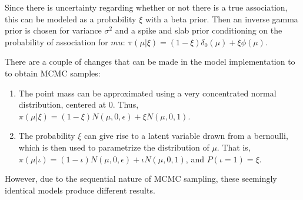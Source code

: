 \documentclass[12pt,twoside]{dukestatscithesis}
\theoremstyle{definition}
\theoremstyle{definition}
\theoremstyle{definition}
\theoremstyle{remark}
\begin{document}
\begin{Shaded}
\begin{Highlighting}[]
\NormalTok{(}\NormalTok{)}
\StringTok{ }
\StringTok{ }\OperatorTok{^}\NormalTok{(}\OperatorTok{-}\NormalTok{)) }
\StringTok{ }\NormalTok{(}\OperatorTok{*}
 \OperatorTok{:}
\NormalTok{    Y[((i}\OperatorTok{-}\NormalTok{)}\OperatorTok{*}\OperatorTok{+}\NormalTok{)}\OperatorTok{:}\OperatorTok{*}\NormalTok{observations)]<-}\NormalTok{, }\OperatorTok{/}\NormalTok{(}\OperatorTok{+}
\NormalTok{    site[((i}\OperatorTok{-}\NormalTok{)}\OperatorTok{*}\OperatorTok{+}\NormalTok{)}\OperatorTok{:}\OperatorTok{*}\NormalTok{observations)]<-}\StringTok{ }
\NormalTok{\}}
\NormalTok{<-}\NormalTok{(}\OperatorTok{*}

\NormalTok{(}\NormalTok{)}
\NormalTok{#############}
\end{Highlighting}
\end{Shaded}
Since there is uncertainty regarding whether or not there is a true
association, this can be modeled as a probability \(\xi\) with a beta
prior. Then an inverse gamma prior is chosen for variance \(\sigma^2\)
and a spike and slab prior conditioning on the probability of
association for \(mu\):
\(\pi(\mu|\xi) = (1-\xi ) \delta_0(\mu)+ \xi\phi(\mu)\).

There are a couple of changes that can be made in the model
implementation to to obtain MCMC samples:
\begin{enumerate}
\def\labelenumi{\arabic{enumi}.}
\item
  The point mass can be approximated using a very concentrated normal
  distribution, centered at 0. Thus,
  \(\pi(\mu|\xi) = (1-\xi) N(\mu, 0, \epsilon)+ \xi N(\mu,0 ,1)\).
\item
  The probability \(\xi\) can give rise to a latent variable drawn from
  a bernoulli, which is then used to parametrize the distribution of
  \(\mu\). That is,
  \(\pi(\mu|\iota) = (1-\iota ) N(\mu, 0, \epsilon)+ \iota N(\mu,0 ,1)\),
  and \(P(\iota = 1 ) = \xi\).
\end{enumerate}
However, due to the sequential nature of MCMC sampling, these seemingly
identical models produce different results.
\end{document}
